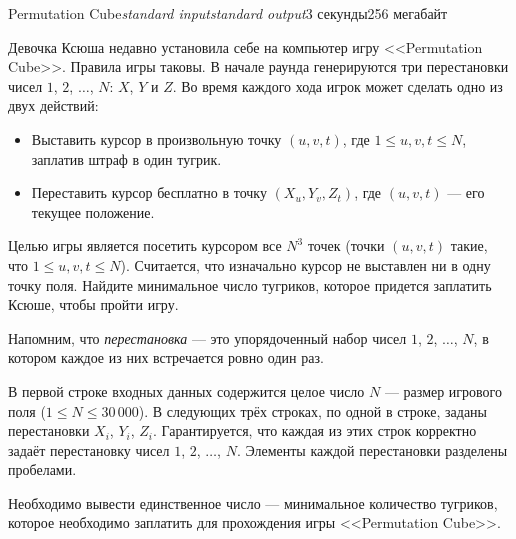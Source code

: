\begin{problem}{Permutation Cube}{\textsl{standard input}}{\textsl{standard output}}{3 секунды}{256 мегабайт}

Девочка Ксюша недавно установила себе на компьютер игру <<Permutation Cube>>. Правила игры таковы. В начале раунда генерируются три перестановки чисел $1$, $2$, $\dots$, $N$: $X$, $Y$ и $Z$. Во время каждого хода игрок может сделать одно из двух действий:
\begin{itemize}
\item Выставить курсор в произвольную точку $(u, v, t)$, где $1 \le u, v, t \le N$, заплатив штраф в один тугрик.
\item Переставить курсор бесплатно в точку $(X_u, Y_v, Z_t)$, где $(u, v, t)$ --- его текущее положение.
\end{itemize}

Целью игры является посетить курсором все $N^3$ точек (точки $(u, v, t)$ такие, что $1 \le u, v, t \le N$). Считается, что изначально курсор не выставлен ни в одну точку поля. Найдите минимальное число тугриков, которое придется заплатить Ксюше, чтобы пройти игру.

Напомним, что \emph{перестановка} --- это упорядоченный набор чисел $1$, $2$, $\dots$, $N$, в котором каждое из них встречается ровно один раз.

\InputFile
В первой строке входных данных содержится целое число $N$ --- размер игрового поля ($1 \le N \le 30\,000$). В следующих трёх строках, по одной в строке, заданы перестановки $X_i$, $Y_i$, $Z_i$. Гарантируется, что каждая из этих строк корректно задаёт перестановку чисел $1$, $2$, $\dots$, $N$. Элементы каждой перестановки разделены пробелами.

\OutputFile
Необходимо вывести единственное число --- минимальное количество тугриков, которое необходимо заплатить для прохождения игры <<Permutation Cube>>.

\Examples

\begin{example}
%
%
\end{example}

\end{problem}
